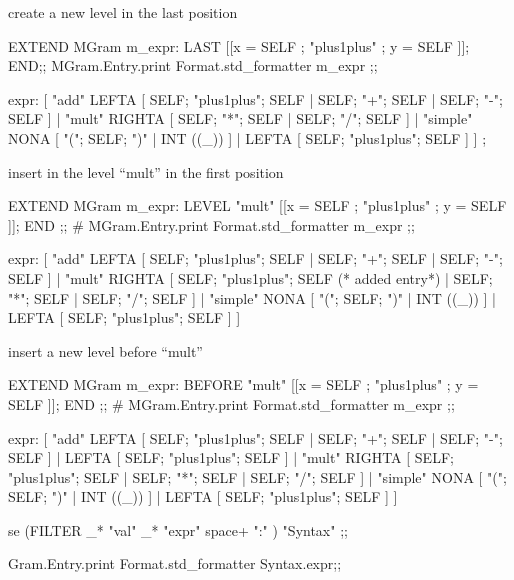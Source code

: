 \begin{enumerate}[(a)]
\begin{enumerate}[(a)]
create a new level in the last position 
\begin{redcode}
EXTEND MGram  m_expr: LAST [[x = SELF ; "plus1plus" ; y = SELF ]]; END;;
MGram.Entry.print Format.std_formatter m_expr ;;
\end{redcode}

\begin{bluecode}
expr: [ "add" LEFTA
  [ SELF; "plus1plus"; SELF
  | SELF; "+"; SELF
  | SELF; "-"; SELF ]
| "mult" RIGHTA
  [ SELF; "*"; SELF
  | SELF; "/"; SELF ]
| "simple" NONA
  [ "("; SELF; ")"
  | INT ((_)) ]
| LEFTA
[ SELF; "plus1plus"; SELF ] ] ; 
\end{bluecode}

insert in the level ``mult'' in the first position 
\begin{redcode}
EXTEND MGram  m_expr: LEVEL "mult" [[x = SELF ; "plus1plus" ; y = SELF ]]; END ;;
# MGram.Entry.print Format.std_formatter m_expr ;;
\end{redcode}

\begin{bluecode}
expr: [ "add" LEFTA
  [ SELF; "plus1plus"; SELF
  | SELF; "+"; SELF
  | SELF; "-"; SELF ]
| "mult" RIGHTA
  [ SELF; "plus1plus"; SELF (* added entry*)
  | SELF; "*"; SELF
  | SELF; "/"; SELF ]
| "simple" NONA
  [ "("; SELF; ")"
  | INT ((_)) ]
| LEFTA
  [ SELF; "plus1plus"; SELF ] ]  
\end{bluecode}

insert a new level before ``mult'' 
\begin{redcode}
EXTEND MGram  m_expr: BEFORE "mult" [[x = SELF ; "plus1plus" ; y = SELF ]]; END ;;
# MGram.Entry.print Format.std_formatter m_expr ;;
\end{redcode}

\begin{bluecode}
expr: [ "add" LEFTA
  [ SELF; "plus1plus"; SELF
  | SELF; "+"; SELF
  | SELF; "-"; SELF ]
| LEFTA
  [ SELF; "plus1plus"; SELF ]
| "mult" RIGHTA
  [ SELF; "plus1plus"; SELF
  | SELF; "*"; SELF
  | SELF; "/"; SELF ]
| "simple" NONA
  [ "("; SELF; ")"
  | INT ((_)) ]
| LEFTA
  [ SELF; "plus1plus"; SELF ] ]
\end{bluecode}

\begin{redcode}
se (FILTER _* "val" _* "expr" space+ ":" ) "Syntax" ;;
\end{redcode}

\begin{redcode}  
Gram.Entry.print Format.std_formatter Syntax.expr;;
\end{redcode}



\end{enumerate}
\end{enumerate}
